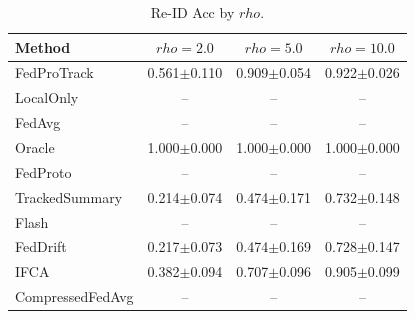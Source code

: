 \begin{table}[t]
\centering
\caption{Re-ID Acc by $rho$.}
\label{tab:rho_concept_re_id_accuracy}
\begin{tabular}{lccc}
\toprule
Method & $rho=2.0$ & $rho=5.0$ & $rho=10.0$ \\
\midrule
FedProTrack & 0.561$\pm$0.110 & 0.909$\pm$0.054 & 0.922$\pm$0.026 \\
LocalOnly & -- & -- & -- \\
FedAvg & -- & -- & -- \\
Oracle & 1.000$\pm$0.000 & 1.000$\pm$0.000 & 1.000$\pm$0.000 \\
FedProto & -- & -- & -- \\
TrackedSummary & 0.214$\pm$0.074 & 0.474$\pm$0.171 & 0.732$\pm$0.148 \\
Flash & -- & -- & -- \\
FedDrift & 0.217$\pm$0.073 & 0.474$\pm$0.169 & 0.728$\pm$0.147 \\
IFCA & 0.382$\pm$0.094 & 0.707$\pm$0.096 & 0.905$\pm$0.099 \\
CompressedFedAvg & -- & -- & -- \\
\bottomrule
\end{tabular}
\end{table}